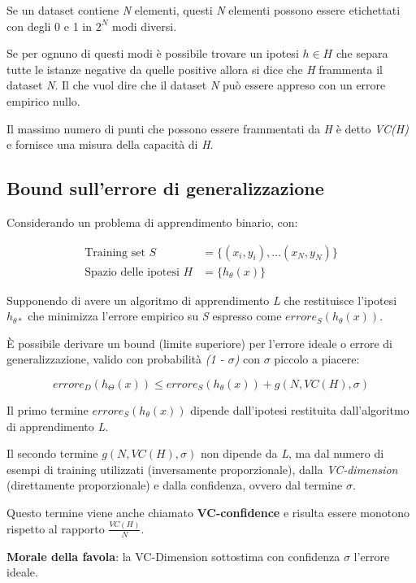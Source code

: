Se un dataset contiene \emph{N} elementi, questi \emph{N} elementi
possono essere etichettati con degli 0 e 1 in $2^N$ modi diversi.

Se per ognuno di questi modi è possibile trovare un ipotesi $h \in H$
che separa tutte le istanze negative da quelle positive allora si dice
che \emph{H} frammenta il dataset \emph{N}. 
Il che vuol dire che il dataset \emph{N} può essere appreso con un errore empirico nullo.

Il massimo numero di punti che possono essere frammentati da \emph{H} è
detto \emph{VC(H)} e fornisce una misura della capacità di \emph{H}.

\subsection{Bound sull'errore di generalizzazione}\label{sec:vcc}

Considerando un problema di apprendimento binario, con:

\begin{align*}
\text{Training set }S &= \{(x_i,y_i), \ldots (x_N, y_N)\} \\
\text{Spazio delle ipotesi } H &=\{h_\theta(x)\} 
\end{align*}

Supponendo di avere un algoritmo di apprendimento \emph{L} che
restituisce l'ipotesi $h_{\theta*}$ che minimizza l'errore empirico su
\emph{S} espresso come $errore_S(h_\theta(x))$.

È possibile derivare un bound (limite superiore) per l'errore ideale o
errore di generalizzazione, valido con probabilità \emph{(1 - $\sigma$)} con
$\sigma$ piccolo a piacere:

$$
errore_D(h_\Theta(x)) \leq  errore_S(h_{\theta}(x)) + g(N, VC(H), \sigma)
$$

Il primo termine $errore_S(h_{\theta}(x))$ dipende dall'ipotesi restituita
dall'algoritmo di apprendimento \textit{L}.

Il secondo termine $g(N, VC(H), \sigma)$ non dipende da \emph{L}, ma dal
numero di esempi di training utilizzati (inversamente proporzionale),
dalla \emph{VC-dimension} (direttamente proporzionale) e dalla
confidenza, ovvero dal termine $\sigma$.

Questo termine viene anche chiamato \textbf{VC-confidence} e risulta essere monotono rispetto al rapporto
$\frac{VC(H)}{N}$.

\textbf{Morale della favola}: la VC-Dimension sottostima con confidenza $\sigma$ l'errore ideale.

